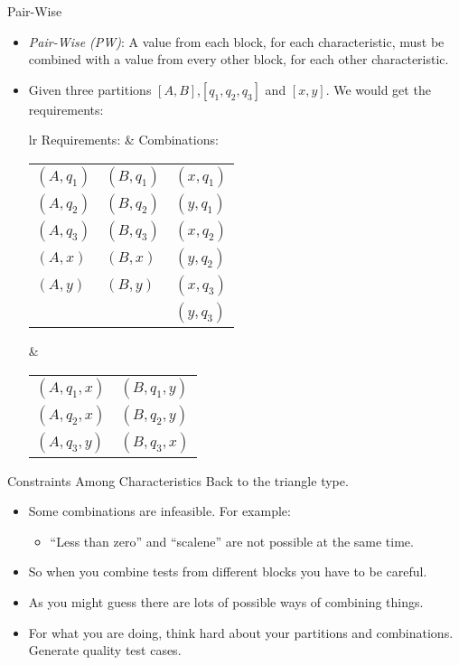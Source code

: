 \documentclass{beamer}
\begin{document}
\begin{frame}{Pair-Wise}
  \begin{itemize}
  \item {\em Pair-Wise (PW)}: A value from each block, for each
    characteristic, must be combined with a value from every other
    block, for each other characteristic.
  \item Given three partitions  $[A,B]$,$[q_1,q_2,q_3]$ and
    $[x,y]$. We would get the requirements:

{\small
\vspace{2mm}
\begin{tabular}{lr}
\vspace{2mm}
  {\large Requirements:} & {\large Combinations:} \\
    \begin{tabular}{lll}
      $(A,q_1)$ & $(B,q_1)$ & $(x,q_1)$ \\
      $(A,q_2)$ & $(B,q_2)$ & $(y,q_1)$ \\
      $(A,q_3)$ & $(B,q_3)$ & $(x,q_2)$ \\
      $(A,x)$  & $(B,x)$   & $(y,q_2)$ \\
      $(A,y)$  & $(B,y)$   & $(x,q_3)$ \\
               &           & $(y,q_3)$
    \end{tabular}
&  
\begin{tabular}{ll}
  $(A,q_1,x)$ & $(B,q_1,y)$ \\
  $(A,q_2,x)$ & $(B,q_2,y)$ \\
  $(A,q_3,y)$ & $(B,q_3,x)$ \\
\end{tabular}
\end{tabular}
}


  \end{itemize}
\end{frame}
\begin{frame}{Constraints Among Characteristics}
  Back to the triangle type.
  \begin{itemize}
  \item Some combinations are infeasible. For example:
    \begin{itemize}
    \item ``Less than zero'' and ``scalene'' are not possible at the same time.
    \end{itemize}
  \item So when you combine tests from different blocks you have to be
    careful.
  \item As you might guess there are lots of possible ways of combining
    things.
    \item For what you are doing, think hard about your partitions and
      combinations. Generate quality test cases.
      
  \end{itemize}

  
\end{frame}
\end{document}
